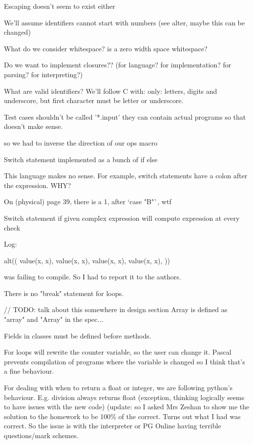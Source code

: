 \documentclass{article}
\begin{document}
Escaping doesn't seem to exist either

We'll assume identifiers cannot start with numbers (see alter, maybe this can
be changed)

What do we consider whitespace? is a zero width space whitespace?

Do we want to implement closures?? (for language? for implementation? for parsing? for interpreting?)

What are valid identifiers? We'll follow C with: only: letters, digits and
underscore, but first character must be letter or underscore.

Test cases shouldn't be called '*.input' they can contain actual programs so
that doesn't make sense.


so we had to inverse the direction of our ops macro


Switch statement implemented as a bunch of if else

This language makes no sense. For example, switch statements have a colon after
the expression. WHY?

On (physical) page 39, there is a 1, after `case "B"`, wtf

Switch statement if given complex expression will compute expression at every
check

Log:


alt((
	value(x, x),
	value(x, x),
	value(x, x),
	value(x, x),
))

was failing to compile. So I had to report it to the authors.

There is no "break" statement for loops.

// TODO: talk about this somewhere in design section
Array is defined as "array" and "Array" in the spec...

Fields in classes must be defined before methods.

For loops will rewrite the counter variable, so the user can change it.
Pascal prevents compilation of programs where the variable is changed so I
think that's a fine behaviour.

For dealing with when to return a float or integer, we are following python's
behaviour. E.g. division always returns float (exception, thinking logically
seems to have issues with the new code) (update: so I asked Mrs Zeshan to show
me the solution to the homework to be 100\% of the correct. Turns out what I
had was correct. So the issue is with the interpreter or PG Online having
terrible questions/mark schemes.
\end{document}
